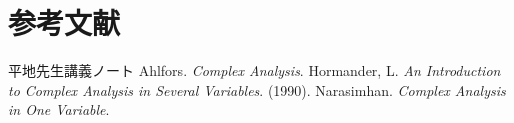 \documentclass[uplatex, dvipdfmx]{jsreport}
\begin{document}
\chapter{参考文献}

\begin{thebibliography}{99}
    平地先生講義ノート
    Ahlfors. \textit{Complex Analysis}.
    Hormander, L. \textit{An Introduction to Complex Analysis in Several Variables}. (1990).
    Narasimhan. \textit{Complex Analysis in One Variable}.
\end{thebibliography}
\end{document}
